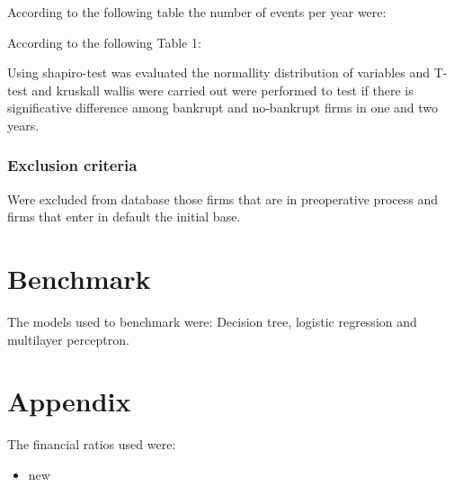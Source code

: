 \documentclass[journal]{IEEEtai}
\begin{document}
According  to the following table the number of events per year were:

According to the following Table 1:

Using shapiro-test was evaluated the normallity distribution of variables and T-test and kruskall wallis were carried out were performed to test if there is significative difference among bankrupt and no-bankrupt firms in one and two years.

\subsubsection{Exclusion criteria}
Were excluded from database those firms that are in preoperative process and firms that enter in default the initial base.	




\section{Benchmark}

The models used to benchmark were: Decision tree, logistic regression and multilayer perceptron.





\section{Appendix}
The financial ratios used were:

\begin{itemize}
\item new
\end{itemize}

\newpage
\printbibliography
\end{document}
